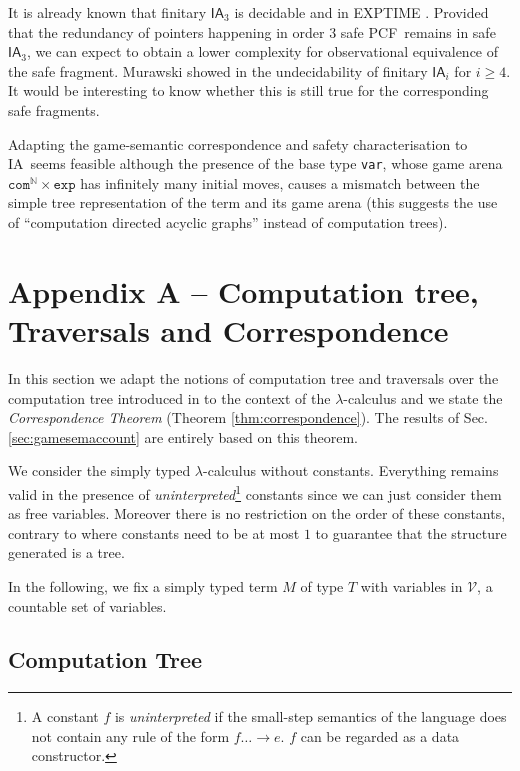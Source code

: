 \documentclass{llncs}
\newcommand\nat{\mathbb{N}}
\newcommand\ialgol{\textsf{IA}}
\newcommand\iacom{\texttt{com}}
\newcommand\iaexp{\texttt{exp}}
\newcommand\iavar{\texttt{var}}
\newcommand\pcf{\textsf{PCF}}
\begin{document}
It is already known that finitary $\ialgol_3$ is decidable and in EXPTIME \cite{DBLP:conf/fossacs/MurawskiW05}. 
Provided that the redundancy of pointers happening in order $3$ safe \pcf\ remains in safe $\ialgol_3$, we can expect to obtain a lower complexity for observational equivalence of the safe fragment.
Murawski showed in \cite{murawski03program} the undecidability of finitary $\ialgol_i$ for $i\geq4$.
It would be interesting to know whether this is still true for the corresponding safe fragments.

Adapting the game-semantic correspondence and safety characterisation to \ialgol\ seems feasible although the presence of the base type \iavar, whose game arena $\iacom^{\nat} \times \iaexp$ has infinitely many initial moves, causes a mismatch between the simple tree representation of the term and its game arena (this suggests the use of ``computation directed acyclic graphs'' instead of computation trees). 





\section*{Appendix A -- Computation tree, Traversals and Correspondence}
\label{sec:correspondence}

In this section we adapt the notions of computation tree and
traversals over the computation tree introduced in \cite{OngLics2006} to the context of the $\lambda$-calculus
and we state the \emph{Correspondence Theorem} (Theorem \ref{thm:correspondence}).
The results of Sec. \ref{sec:gamesemaccount} are entirely based on this theorem.

We consider the simply typed $\lambda$-calculus without constants. Everything remains valid in the presence of
\emph{uninterpreted}\footnote{A constant $f$ is \emph{uninterpreted}
if the small-step semantics of the language does not contain any rule of the form $f \dots \rightarrow e$. $f$ can be regarded as a data constructor.}
constants since we can just consider them as free variables. Moreover there is no restriction on the order of these constants, contrary to \cite{OngLics2006} where constants need to be at most $1$ to guarantee that the structure generated is a tree.

In the following, we fix a simply typed term $M$ of type $T$ with variables in $\mathcal{V}$, a countable set of variables.
\subsection{Computation Tree}
\end{document}
